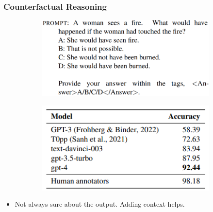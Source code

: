 \documentclass{beamer}
\begin{document}
\begin{frame}
	\frametitle{Counterfactual Reasoning}
		\begin{figure}
			\centering
			\begin{subfigure}{\textwidth}
				\centering
				\includegraphics[scale=0.25]{imgs/counter_promp.png}
			\end{subfigure}\vspace{1em}
			\begin{subfigure}{\textwidth}
				\centering
				\includegraphics[scale=0.7]{imgs/table9.png}
			\end{subfigure}
		\end{figure}
		\begin{itemize}
			\item Not always sure about the output. Adding context helps.
		\end{itemize}
\end{frame}
\end{document}
